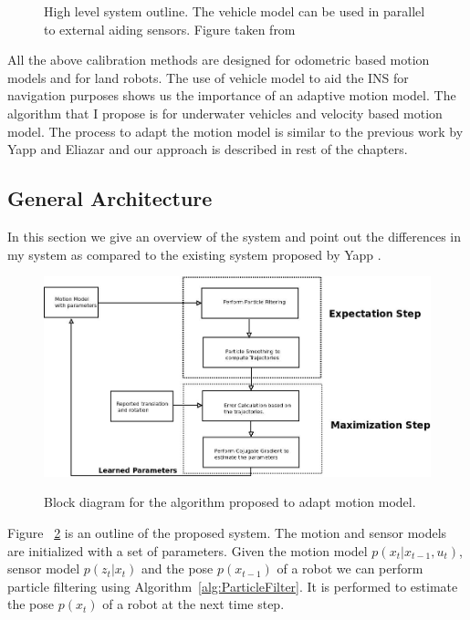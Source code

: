 \documentclass[12pt]{dalcsthesis}
\begin{document}
\begin{figure}
  \centering
  \qquad
 
  \caption{\label{fig-INS systems}High level system outline. The vehicle model can be used in parallel to external aiding sensors. Figure taken from \cite{Hegrenæs2008}}
\end{figure}

All the above calibration methods are designed for odometric based motion models and for land robots. The use of vehicle model to aid the INS for navigation purposes shows us the importance of an adaptive motion model. The algorithm that I propose is for underwater vehicles and velocity based motion model. The process to adapt the motion model is similar to the previous work by Yapp and Eliazar and our approach is described in rest of the chapters.

\subsection{General Architecture}
In this section we give an overview of the system and point out the differences in my system as compared to the existing system proposed by Yapp \cite{Yap2008}. 
\begin{figure}
  \centering
     {\includegraphics[height = 3.0 in]{Diagram1.jpeg}}
  \caption{\label{fig-General Architecture} Block diagram for the algorithm proposed to adapt motion model.}
\end{figure}
Figure ~\ref{fig-General Architecture} is an outline of the proposed system. The motion and sensor models are initialized with a set of parameters. Given the motion model $p(x_{t}|x_{t-1},u_{t})$, sensor model $p(z_{t}|x_{t})$ and the pose $p(x_{t-1})$ of a robot we can perform particle filtering using Algorithm~\ref{alg:ParticleFilter}. It is performed to estimate the pose $p(x_{t})$ of a robot at the next time step. 
\end{document}
